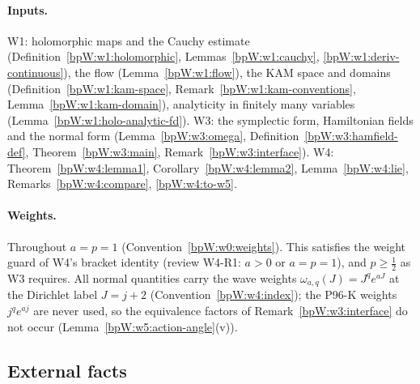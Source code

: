 \paragraph{Inputs.} W1: holomorphic maps and the Cauchy estimate (Definition~\ref{bpW:w1:holomorphic},
Lemmas~\ref{bpW:w1:cauchy}, \ref{bpW:w1:deriv-continuous}), the flow (Lemma~\ref{bpW:w1:flow}), the KAM space and
domains (Definition~\ref{bpW:w1:kam-space}, Remark~\ref{bpW:w1:kam-conventions}, Lemma~\ref{bpW:w1:kam-domain}),
analyticity in finitely many variables (Lemma~\ref{bpW:w1:holo-analytic-fd}). W3: the symplectic form, Hamiltonian
fields and the normal form (Lemma~\ref{bpW:w3:omega}, Definition~\ref{bpW:w3:hamfield-def},
Theorem~\ref{bpW:w3:main}, Remark~\ref{bpW:w3:interface}). W4: Theorem~\ref{bpW:w4:lemma1},
Corollary~\ref{bpW:w4:lemma2}, Lemma~\ref{bpW:w4:lie}, Remarks~\ref{bpW:w4:compare}, \ref{bpW:w4:to-w5}.

\paragraph{Weights.} Throughout $a=p=1$ (Convention~\ref{bpW:w0:weights}). This satisfies the weight guard of W4's
bracket identity (review W4-R1: $a>0$ or $a=p=1$), and $p\ge\frac12$ as W3 requires. All normal quantities carry the
wave weights $\omega_{a,q}(J)=J^qe^{aJ}$ at the Dirichlet label $J=j+2$ (Convention~\ref{bpW:w4:index}); the P96-K
weights $j^qe^{aj}$ are never used, so the equivalence factors of Remark~\ref{bpW:w3:interface} do not occur
(Lemma~\ref{bpW:w5:action-angle}(v)).

\subsection{External facts}\label{bpW:w5:ext}

